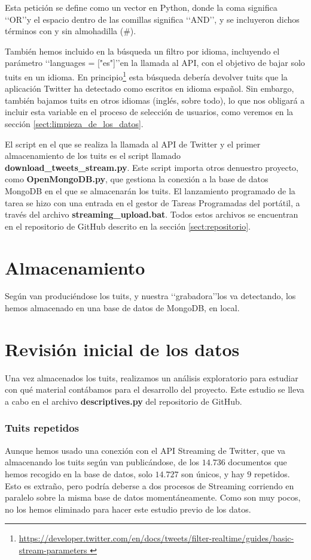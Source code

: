 Esta petición se define como un vector en Python, donde la coma significa \lq\lq OR\rq\rq y el espacio
dentro de las comillas significa \lq\lq AND\rq\rq, y se incluyeron dichos términos con y sin almohadilla 
(\#).

También hemos incluido en la búsqueda un filtro por idioma, incluyendo el parámetro 
\lq\lq languages = ["es"]\rq\rq en la llamada al API, con el objetivo de bajar solo tuits
en un idioma. En principio\footnote{\url{https://developer.twitter.com/en/docs/tweets/filter-realtime/guides/basic-stream-parameters }}
esta búsqueda debería devolver tuits que la aplicación Twitter ha detectado como escritos en
idioma español. Sin embargo, también bajamos tuits en otros idiomas (inglés, sobre todo), lo que
nos obligará a incluir esta variable en el proceso de selección de usuarios, como veremos en la sección \ref{sect:limpieza_de_los_datos}.

El script en el que se realiza la llamada al API de Twitter y el primer almacenamiento de los tuits
es el script llamado {\bf download\_tweets\_stream.py}. Este script importa otros
denuestro proyecto, como {\bf OpenMongoDB.py}, que gestiona la conexión a la base de datos MongoDB
en el que se almacenarán los tuits. El lanzamiento programado de la tarea se hizo con una entrada en el gestor
de Tareas Programadas del portátil, a través del archivo {\bf streaming\_upload.bat}. Todos estos
archivos se encuentran en el repositorio de GitHub descrito en la sección \ref{sect:repositorio}.


\section{Almacenamiento}
Según van produciéndose los tuits, y nuestra \lq\lq grabadora\rq\rq los va detectando, los hemos almacenado
en una base de datos de MongoDB, en local.


\section{Revisión inicial de los datos}
Una vez almacenados los tuits, realizamos un análisis exploratorio para estudiar con qué material contábamos para el desarrollo del proyecto. Este estudio se lleva a cabo en el archivo {\bf descriptives.py} del repositorio de
GitHub.

\subsubsection{Tuits repetidos}
Aunque hemos usado una conexión con el API Streaming de Twitter, que va almacenando los
tuits según van publicándose,  de los $14.736$ documentos que hemos recogido en la base de datos, 
solo $14.727$ son únicos, y hay $9$ repetidos. Esto es extraño, pero podría deberse a dos procesos
de Streaming corriendo en paralelo sobre la misma base de datos momentáneamente. Como son muy pocos, no los hemos eliminado para hacer este estudio previo de los datos.

